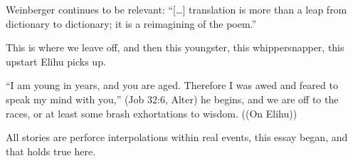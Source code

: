 Weinberger continues to be relevant: ``{[}\ldots{]} translation is more than a leap from dictionary to dictionary; it is a reimagining of the poem.'' \parencite[46]{wangwei}

This is where we leave off, and then this youngster, this whippersnapper, this upstart Elihu picks up.

``I am young in years, and you are aged. Therefore I was awed and feared to speak my mind with you,'' (Job 32:6, Alter) he begins, and we are off to the races, or at least some brash exhortations to wisdom.
((On Elihu))

All stories are perforce interpolations within real events, this essay began, and that holds true here.
